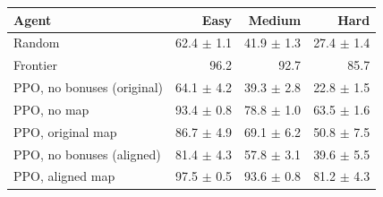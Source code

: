 \begin{tabular}{@{}lrrr@{}}\toprule
Agent & Easy & Medium & Hard\\\midrule
Random & 62.4 $\pm$ 1.1 & 41.9 $\pm$ 1.3 & 27.4 $\pm$ 1.4\\
Frontier & 96.2 & 92.7 & 85.7\\
PPO, no bonuses (original) & 64.1 $\pm$ 4.2 & 39.3 $\pm$ 2.8 & 22.8 $\pm$ 1.5\\
PPO, no map & 93.4 $\pm$ 0.8 & 78.8 $\pm$ 1.0 & 63.5 $\pm$ 1.6\\
PPO, original map & 86.7 $\pm$ 4.9 & 69.1 $\pm$ 6.2 & 50.8 $\pm$ 7.5\\
PPO, no bonuses (aligned) & 81.4 $\pm$ 4.3 & 57.8 $\pm$ 3.1 & 39.6 $\pm$ 5.5\\
\rowcolor{accent!8}PPO, aligned map & 97.5 $\pm$ 0.5 & 93.6 $\pm$ 0.8 & 81.2 $\pm$ 4.3\\
\bottomrule\end{tabular}
